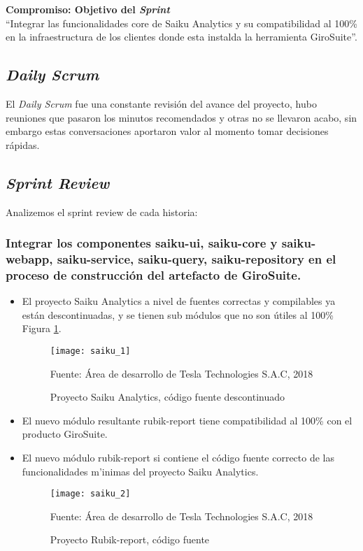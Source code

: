 \begin{spacing}{1.5}
		\textbf{Compromiso: Objetivo del \textit{Sprint}}\\
	``Integrar las funcionalidades core de Saiku Analytics y su compatibilidad al 100\% en la infraestructura de los clientes donde esta instalda la herramienta GiroSuite''.\\
		
	\subsection{\textit{Daily Scrum}}
		El \textit{Daily Scrum} fue una constante revisi\'{o}n del avance del proyecto, hubo reuniones que pasaron los minutos recomendados y otras no se llevaron acabo, sin embargo estas conversaciones aportaron valor al momento tomar decisiones r\'{a}pidas.
	
	\clearpage		
	\subsection{\textit{Sprint Review}}
		Analizemos el sprint review de cada historia:
		\subsubsection{Integrar los componentes saiku-ui, saiku-core y saiku-webapp, saiku-service, saiku-query, saiku-repository en el proceso de construcción del artefacto de GiroSuite.}
		
		\begin{itemize}
			\item El proyecto Saiku Analytics a nivel de fuentes correctas y compilables ya est\'{a}n descontinuadas, y se tienen sub m\'{o}dulos que no son \'{u}tiles al 100\% Figura \ref{figure:chaperIII_4}.
			
			\begin{figure}[H]
				\centering
				\texttt{[image: saiku\_1]}
				\caption {\centering \small{Proyecto Saiku Analytics, c\'{o}digo fuente descontinuado}} \label{figure:chaperIII_4}
				\small {Fuente: \'{A}rea de desarrollo de Tesla Technologies S.A.C, 2018}
			\end{figure}
			\item El nuevo m\'{o}dulo resultante rubik-report tiene compatibilidad al 100\% con el producto GiroSuite.
			\item El nuevo m\'{o}dulo rubik-report si contiene el c\'{o}digo fuente correcto de las funcionalidades m'{i}nimas del proyecto Saiku Analytics.
			
			\begin{figure}[H]
				\centering
				\texttt{[image: saiku\_2]}
				\caption {\centering \small{Proyecto Rubik-report, c\'{o}digo fuente}} \label{figure:chaperIII_5}
				\small {Fuente: \'{A}rea de desarrollo de Tesla Technologies S.A.C, 2018}
			\end{figure}
			

\end{itemize}
\end{spacing}
